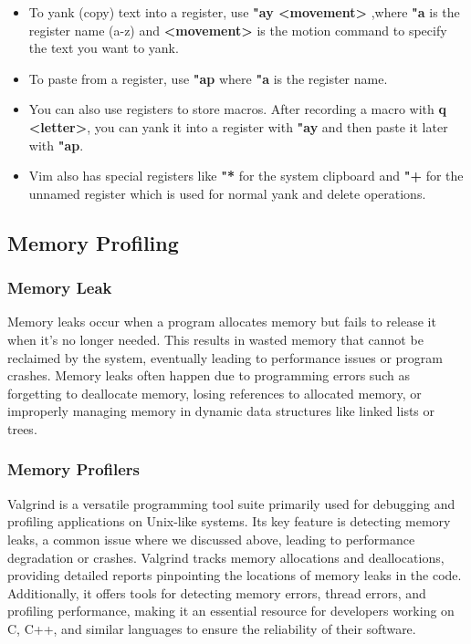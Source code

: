 \documentclass[titlepage]{article}
\begin{document}
\begin{itemize}
\item To yank (copy) text into a register, use \textbf{"ay <movement>} ,where \textbf{"a} is the register name (a-z) and \textbf{<movement>} is the motion command to specify the text you want to yank.
\item To paste from a register, use \textbf{"ap} where \textbf{"a} is the register name.
\item You can also use registers to store macros. After recording a macro with \textbf{q <letter>}, you can yank it into a register with \textbf{"ay} and then paste it later with \textbf{"ap}.
\item Vim also has special registers like \textbf{"*} for the system clipboard and \textbf{"+} for the unnamed register which is used for normal yank and delete operations.
\end{itemize}

\subsection{Memory Profiling}
\subsubsection{Memory Leak}

Memory leaks occur when a program allocates memory but fails to release it when it's no longer needed. This results in wasted memory that cannot be reclaimed by the system, eventually leading to performance issues or program crashes. Memory leaks often happen due to programming errors such as forgetting to deallocate memory, losing references to allocated memory, or improperly managing memory in dynamic data structures like linked lists or trees.

\subsubsection{Memory Profilers}
Valgrind is a versatile programming tool suite primarily used for debugging and profiling applications on Unix-like systems. Its key feature is detecting memory leaks, a common issue where we discussed above, leading to performance degradation or crashes. Valgrind tracks memory allocations and deallocations, providing detailed reports pinpointing the locations of memory leaks in the code. Additionally, it offers tools for detecting memory errors, thread errors, and profiling performance, making it an essential resource for developers working on C, C++, and similar languages to ensure the reliability of their software.
\end{document}
